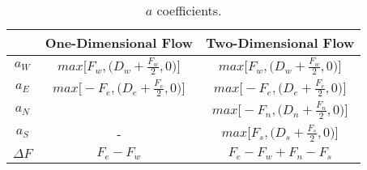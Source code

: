 \begin{table}[htbp]
  \centering
  \caption{$a$ coefficients.}
  \label{tab:coefsa}
    \begin{tabular}{|c|c|c|}
      \hline
      \rule{0pt}{2ex}
     & One-Dimensional Flow     & Two-Dimensional Flow 
    \\
    \hline
	\rule{0pt}{4ex}  
    $a_W$  &$max\bigg[F_w, \bigg(D_w+\frac{F_w}{2},0\bigg)\bigg]$ & $max\bigg[F_w, \bigg(D_w+\frac{F_w}{2},0\bigg)\bigg]$ \\ [2ex]
    \hline
	\rule{0pt}{4ex}  
	$a_E$  &$max\bigg[-F_e, \bigg(D_e+\frac{F_e}{2},0\bigg)\bigg]$ &$max\bigg[-F_e, \bigg(D_e+\frac{F_e}{2},0\bigg)\bigg]$ \\ [2ex]
	\hline
	\rule{0pt}{4ex}  
	$a_N$  & \centering{-} &$max\bigg[-F_n, \bigg(D_n+\frac{F_n}{2},0\bigg)\bigg]$ \\ [2ex]
	\hline
	\rule{0pt}{4ex}  
	$a_S$  & - &$max\bigg[F_s, \bigg(D_s+\frac{F_s}{2},0\bigg)\bigg]$ \\ [2ex]
	\hline
	\rule{0pt}{4ex}  
	$\Delta F$  & $F_e - F_w$ &$F_e-F_w+F_n-F_s$ \\ [2ex]
    \hline
    
    \end{tabular}
\end{table}
